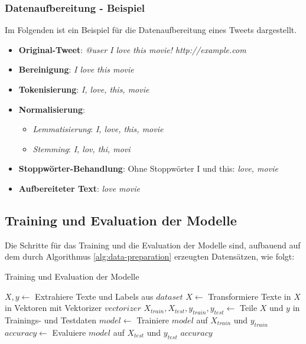 \subsubsection{Datenaufbereitung - Beispiel}

Im Folgenden ist ein Beispiel für die Datenaufbereitung eines Tweets dargestellt.
\begin{itemize}
    \item \textbf{Original-Tweet}: \textit{\glqq @user I love this movie! http://example.com\grqq}
    \item \textbf{Bereinigung}: \textit{\glqq I love this movie\grqq}
    \item \textbf{Tokenisierung}: \textit{\glqq I\grqq, \glqq love\grqq, \glqq this\grqq, \glqq movie\grqq}
    \item \textbf{Normalisierung}:
    \begin{itemize}
        \item \textit{Lemmatisierung}: \textit{\glqq I\grqq, \glqq love\grqq, \glqq this\grqq, \glqq movie\grqq}
        \item \textit{Stemming}: \textit{\glqq I\grqq, \glqq lov\grqq, \glqq thi\grqq, \glqq movi\grqq}
    \end{itemize}
    \item \textbf{Stoppwörter-Behandlung}: Ohne Stoppwörter \glqq{}I\grqq{} und \glqq{}this\grqq{}: \textit{\glqq love\grqq, \glqq movie\grqq}
    \item \textbf{Aufbereiteter Text}: \textit{\glqq love movie\grqq}
\end{itemize}

\subsection{Training und Evaluation der Modelle}

Die Schritte für das Training und die Evaluation der Modelle sind, aufbauend auf dem durch Algorithmus \ref{alg:data-preparation} erzeugten Datensätzen, wie folgt:
\begin{algorithm}
    \caption{Training und Evaluation der Modelle}
    \begin{algorithmic}[1]
            \State $X, y \gets$ Extrahiere Texte und Labels aus $dataset$
            \State $X \gets$ Transformiere Texte in $X$ in Vektoren mit Vektorizer $vectorizer$
            \State $X_{train}, X_{test}, y_{train}, y_{test} \gets$ Teile $X$ und $y$ in Trainings- und Testdaten
            \State $model \gets$ Trainiere $model$ auf $X_{train}$ und $y_{train}$
            \State $accuracy \gets$ Evaluiere $model$ auf $X_{test}$ und $y_{test}$
            \State \Return $accuracy$
        \EndProcedure
    \end{algorithmic}
    \label{alg:model-training}
\end{algorithm}

